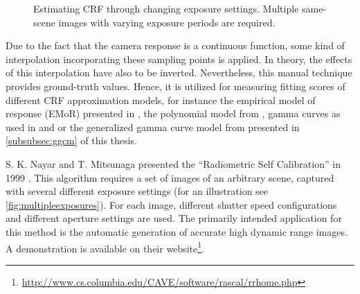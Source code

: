 \begin{figure}[htbp]
  \centering
  \caption[Estimating CRF by changing exposure settings]{Estimating CRF through changing exposure settings. Multiple same-scene images with varying exposure periods are required.}
  \label{fig:multipleexposures}
\end{figure}

Due to the fact that the camera response is a continuous function, some kind of interpolation incorporating these sampling points is applied. In theory, the effects of this interpolation have also to be inverted. Nevertheless, this manual technique provides ground-truth values. Hence, it is utilized for measuring fitting scores of different CRF approximation models, for instance the empirical model of response (EMoR) presented in \cite{CAVE_0091}, the polynomial model from \cite{CAVE_0068}, gamma curves as used in \cite{mann1995being} and \cite{farid2001aa} or the generalized gamma curve model from \cite{ng_cvpr07} presented in \autoref{subsubsec:ggcm} of this thesis.

S. K. Nayar and T. Mitsunaga presented the ``Radiometric Self Calibration'' in 1999 \cite{CAVE_0068}. This algorithm requires a set of images of an arbitrary scene, captured with several different exposure settings (for an illustration see \autoref{fig:multipleexposures}). For each image, different shutter speed configurations and different aperture settings are used. The primarily intended application for this method is the automatic generation of accurate high dynamic range images. A demonstration is available on their website\footnote{\url{http://www.cs.columbia.edu/CAVE/software/rascal/rrhome.php}}.


